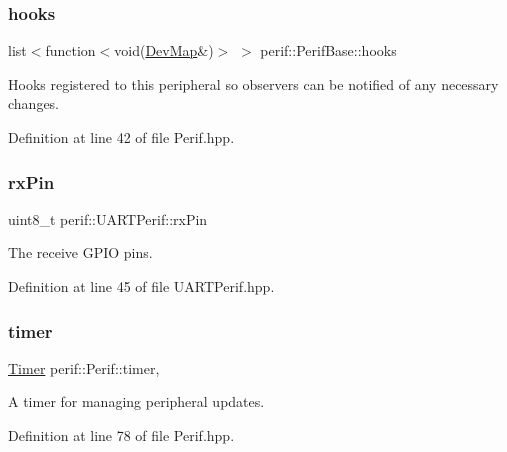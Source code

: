 \mbox{\label{classperif_1_1PerifBase_a98964e5ca8384df64881265e0aa6d7b6}} 
\subsubsection{\texorpdfstring{hooks}{hooks}}
{\footnotesize\ttfamily list$<$function$<$void(\mbox{\hyperlink{Perif_8hpp_a358ff4ee6d24694ee7661f0cce14377e}{Dev\+Map}}\&)$>$ $>$ perif\+::\+Perif\+Base\+::hooks\hspace{0.3cm}{\ttfamily [inherited]}}

Hooks registered to this peripheral so observers can be notified of any necessary changes. 

Definition at line 42 of file Perif.\+hpp.

\mbox{\label{classperif_1_1UARTPerif_a68a86b1e2ca06e42ef72fb4ca0792110}} 
\subsubsection{\texorpdfstring{rxPin}{rxPin}}
{\footnotesize\ttfamily uint8\+\_\+t perif\+::\+U\+A\+R\+T\+Perif\+::rx\+Pin\hspace{0.3cm}{\ttfamily [protected]}}

The receive G\+P\+IO pins. 

Definition at line 45 of file U\+A\+R\+T\+Perif.\+hpp.

\mbox{\label{classperif_1_1Perif_acfa1256201bead82ccce1a0a8bcc24e1}} 
\subsubsection{\texorpdfstring{timer}{timer}}
{\footnotesize\ttfamily \mbox{\hyperlink{classTimer}{Timer}} perif\+::\+Perif\+::timer\hspace{0.3cm}{\ttfamily [protected]}, {\ttfamily [inherited]}}

A timer for managing peripheral updates. 

Definition at line 78 of file Perif.\+hpp.

